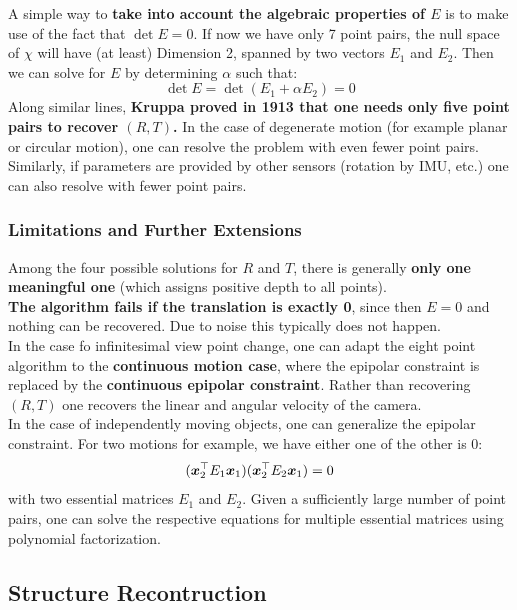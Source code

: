 A simple way to \textbf{take into account the algebraic properties of $E$}
is to make use of the fact that $\det E = 0$.
If now we have only 7 point pairs, the null space of $\chi$ will have
(at least) Dimension 2, spanned by two vectors $E_1$ and $E_2$.
Then we can solve for $E$ by determining $\alpha$ such that:
\[
	\det E = \det (E_1 + \alpha E_2) = 0
\]
Along similar lines,
\textbf{Kruppa proved in 1913 that one needs only five point pairs to recover $(R,T)$.}
In the case of degenerate motion (for example planar or circular motion),
one can resolve the problem with even fewer point pairs.
Similarly, if parameters are provided by other sensors (rotation by IMU, etc.)
one can also resolve with fewer point pairs.


\subsubsection*{Limitations and Further Extensions}%
\label{ssub:limitations_and_further_extensions}


Among the four possible solutions for $R$ and $T$, there is generally
\textbf{only one meaningful one} (which assigns positive depth to all points).\\

\textbf{The algorithm fails if the translation is exactly 0},
since then $E = 0$ and nothing can be recovered.
Due to noise this typically does not happen.\\

In the case fo infinitesimal view point change, one can adapt the eight point
algorithm to the \textbf{continuous motion case}, where the epipolar constraint
is replaced by the \textbf{continuous epipolar constraint}.
Rather than recovering $(R,T)$ one recovers the linear and angular
velocity of the camera.\\

In the case of independently moving objects, one can generalize the epipolar constraint.
For two motions for example, we have either one of the other is 0:
\[
	( \bm{x}_2^{\top} E_1 \bm{x}_1 ) ( \bm{x}_2^{\top} E_2 \bm{x}_1 ) = 0
\]
with two essential matrices $E_1$ and $E_2$.
Given a sufficiently large number of point pairs, one can solve the respective
equations for multiple essential matrices using polynomial factorization.


\subsection{Structure Recontruction}%
\label{sub:structure_recontruction}


